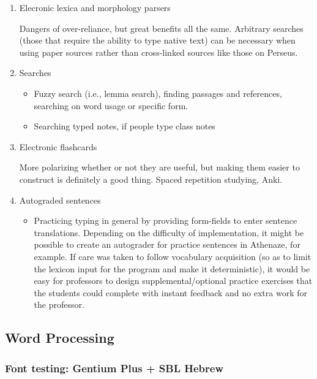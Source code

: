 \documentclass[11pt]{article}
\begin{document}
\begin{enumerate}
\item Elecronic lexica and morphology parsers
\label{sec:org987db42}

Dangers of over-reliance, but great benefits all the same. Arbitrary searches (those that require the ability to type native text) can be necessary when using paper sources rather than cross-linked sources like those on Perseus.

\item Searches
\label{sec:org4ece8ea}

\begin{itemize}
\item Fuzzy search (i.e., lemma search), finding passages and references, searching on word usage or specific form.
\item Searching typed notes, if people type class notes
\end{itemize}

\item Electronic flashcards
\label{sec:org5078300}

More polarizing whether or not they are useful, but making them easier to construct is definitely a good thing. Spaced repetition studying, Anki.

\item Autograded sentences
\label{sec:org9c5f21c}

\begin{itemize}
\item Practicing typing in general by providing form-fields to enter sentence translations. Depending on the difficulty of implementation, it might be possible to create an autograder for practice sentences in Athenaze, for example. If care was taken to follow vocabulary acquisition (so as to limit the lexicon input for the program and make it deterministic), it would be easy for professors to design supplemental/optional practice exercises that the students could complete with instant feedback and no extra work for the professor.
\end{itemize}
\end{enumerate}

\subsection{Word Processing}
\label{sec:orgb0765de}

\subsubsection{Font testing: Gentium Plus + SBL Hebrew}
\label{sec:orgf602a76}
\end{document}
